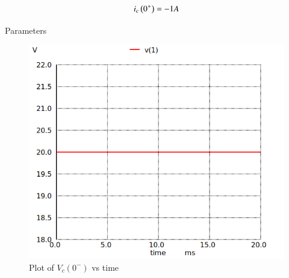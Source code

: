 \documentclass[journal,12pt,twocolumn]{IEEEtran}
\begin{document}
\bigskip


\begin{align}
    i_c \left(0^+\right) = -1A
\end{align}

\begin{table}[ht]
    \begin{adjustbox}{width=\columnwidth}
       
    \end{adjustbox}
    \caption{Parameters}
    \label{tab:Gate.ec.44.1}

\end{table}


\begin{figure}[ht]
   \centering
   \includegraphics[width=0.8\columnwidth]{figs/ckt2.png}
   \caption{Plot of $V_c(0^-)$ vs time}
\end{figure}
\end{document}
